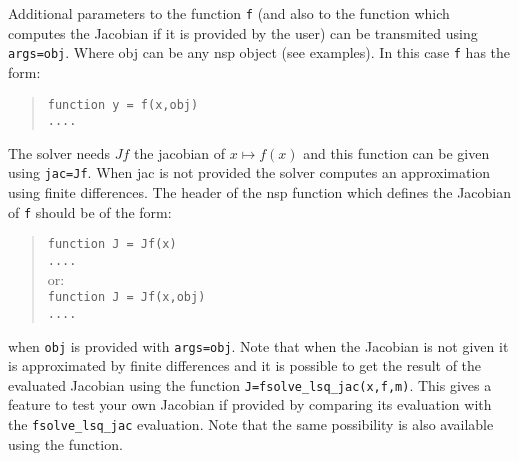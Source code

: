 \begin{mandescription}
Additional parameters to the function \verb+f+ (and also to the function which computes the Jacobian 
if it is provided by the user) can be transmited using \verb+args=obj+. Where obj can be any nsp 
object (see examples). In this case \verb+f+ has the form:
\begin{quote}
{\tt function y = f(x,obj) \\
      ....}
\end{quote}

The solver needs $Jf$ the jacobian of $x \mapsto f(x)$ and this function can be given using 
\verb+jac=Jf+. When jac is not provided the solver computes an approximation using finite differences. 
The header of the nsp function which defines the Jacobian of \verb+f+ should be of the form:
\begin{quote}
{\tt function J = Jf(x) \\
      ....}\\
or:\\
{\tt function J = Jf(x,obj) \\
     ....}
\end{quote}
when {\tt obj} is provided with {\tt args=obj}. 
Note that when the Jacobian is not given it is approximated by finite differences and it is 
possible to get the result of the evaluated Jacobian using the function \verb+J=fsolve_lsq_jac(x,f,m)+.
This gives a feature to test your own Jacobian if provided by comparing its evaluation with the 
\verb+fsolve_lsq_jac+ evaluation. Note that the same possibility is also available using the 
 function. 

\end{mandescription} 

